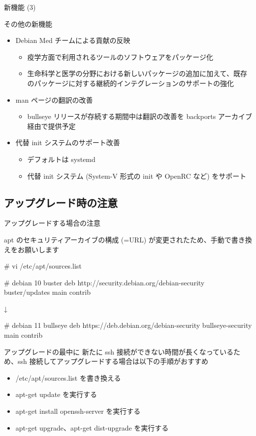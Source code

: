 \begin{frame}{新機能 (3)}

その他の新機能
  
\begin{itemize}
\item Debian Med チームによる貢献の反映
  \begin{itemize}
  \item 疫学方面で利用されるツールのソフトウェアをパッケージ化
  \item 生命科学と医学の分野における新しいパッケージの追加に加えて、既存のパッケージに対する継続的インテグレーションのサポートの強化
  \end{itemize}
\item man ページの翻訳の改善
  \begin{itemize}
  \item bullseye リリースが存続する期間中は翻訳の改善を backports アーカイブ経由で提供予定
  \end{itemize}
\item 代替 init システムのサポート改善
  \begin{itemize}
  \item デフォルトは systemd
  \item 代替 init システム (System-V 形式の init や OpenRC など) をサポート
  \end{itemize}
\end{itemize}

\end{frame}


\subsection{アップグレード時の注意}

\begin{frame}[containsverbatim]{アップグレードする場合の注意}

apt のセキュリティアーカイブの構成 (=URL) が変更されたため、手動で書き換えをお願いします

\begin{commandlinesmall}
# vi /etc/apt/sources.list
  
# debian 10 buster
deb http://security.debian.org/debian-security buster/updates main contrib

↓

# debian 11 bullseye
deb https://deb.debian.org/debian-security bullseye-security main contrib
\end{commandlinesmall}

アップグレードの最中に 新たに ssh 接続ができない時間が長くなっているため、ssh 接続してアップグレードする場合は以下の手順がおすすめ

\begin{itemize}
\item /etc/apt/sources.list を書き換える
\item apt-get update を実行する
\item apt-get install openssh-server を実行する
\item apt-get upgrade、apt-get dist-upgrade を実行する
\end{itemize}

\end{frame}



